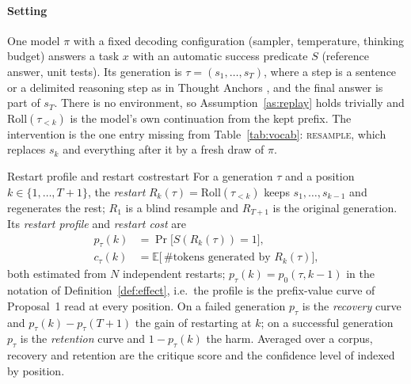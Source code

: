 \paragraph{Setting} One model $\pi$ with a fixed decoding configuration (sampler, temperature, thinking budget) answers a task $x$ with an automatic success predicate $S$ (reference answer, unit tests). Its generation is $\tau=(s_1,\dots,s_T)$, where a step is a sentence or a delimited reasoning step as in Thought Anchors \cite{bogdan2025thoughtanchors}, and the final answer is part of $s_T$. There is no environment, so Assumption~\ref{as:replay} holds trivially and $\mathrm{Roll}(\tau_{<k})$ is the model's own continuation from the kept prefix. The intervention is the one entry missing from Table~\ref{tab:vocab}: \textsc{resample}, which replaces $s_k$ and everything after it by a fresh draw of $\pi$.

\begin{definition}{Restart profile and restart cost}{restart}
For a generation $\tau$ and a position $k\in\{1,\dots,T{+}1\}$, the \emph{restart} $R_k(\tau)=\mathrm{Roll}(\tau_{<k})$ keeps $s_1,\dots,s_{k-1}$ and regenerates the rest; $R_1$ is a blind resample and $R_{T+1}$ is the original generation. Its \emph{restart profile} and \emph{restart cost} are
\begin{align*}
p_\tau(k)&=\Pr\big[S(R_k(\tau))=1\big],\\
c_\tau(k)&=\mathbb{E}\big[\,\#\text{tokens generated by }R_k(\tau)\big],
\end{align*}
both estimated from $N$ independent restarts; $p_\tau(k)=p_0(\tau,k{-}1)$ in the notation of Definition~\ref{def:effect}, i.e.\ the profile is the prefix-value curve of Proposal~1 read at every position. On a failed generation $p_\tau$ is the \emph{recovery} curve and $p_\tau(k)-p_\tau(T{+}1)$ the gain of restarting at $k$; on a successful generation $p_\tau$ is the \emph{retention} curve and $1-p_\tau(k)$ the harm. Averaged over a corpus, recovery and retention are the critique score and the confidence level of \citet{yang2024confcrit} indexed by position.
\end{definition}

